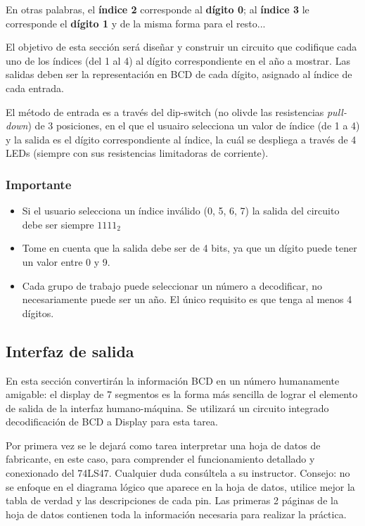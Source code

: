En otras palabras, el \textbf{índice 2} corresponde al \textbf{dígito 0}; al \textbf{índice 3} le corresponde el \textbf{dígito 1} y de la misma forma para el resto...

\vspace{14 pt}

El objetivo de esta sección será diseñar y construir un circuito que codifique cada uno de los índices (del 1 al 4) al dígito correspondiente en el año a mostrar.
Las salidas deben ser la representación en BCD de cada dígito, asignado al índice de cada entrada.

\vspace{14 pt}

El método de entrada es a través del dip-switch (no olivde las resistencias \emph{pull-down}) de 3 posiciones, en el que el usuairo
selecciona un valor de índice (de 1 a 4) y la salida es el dígito correspondiente al índice,
la cuál se despliega a través de 4 LEDs (siempre con sus resistencias limitadoras de corriente).

\subsubsection*{Importante}
\begin{itemize}
    \item Si el usuario selecciona un índice inválido (0, 5, 6, 7) la salida del circuito debe ser siempre $1111_2$
    \item Tome en cuenta que la salida debe ser de 4 bits, ya que un dígito puede tener un valor entre 0 y 9.
    \item Cada grupo de trabajo puede seleccionar un número a decodificar, no necesariamente puede ser un año. El único requisito es que tenga al menos 4 dígitos.
\end{itemize}

\subsection{Interfaz de salida}
En esta sección convertirán la información BCD en un número humanamente amigable: el display de 7 segmentos es la forma más sencilla de lograr
el elemento de salida de la interfaz humano-máquina. Se utilizará un circuito integrado decodificación de BCD a Display para esta tarea.

Por primera vez se le dejará como tarea interpretar una hoja de datos de fabricante, en este caso, para comprender el funcionamiento detallado y
conexionado del 74LS47. Cualquier duda consúltela a su instructor. Consejo: no se enfoque en el diagrama lógico que aparece en la hoja de datos,
utilice mejor la tabla de verdad y las descripciones de cada pin. Las primeras 2 páginas de la hoja de datos contienen toda la información necesaria
para realizar la práctica.

